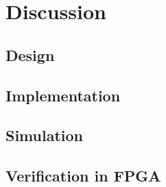 \newpage
\chapter{Discussion}
\section{Design}


\section{Implementation}


\section{Simulation}


\section{Verification in FPGA}
